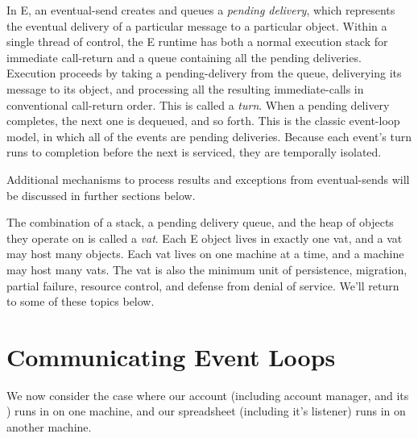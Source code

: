 \documentclass{llncs}
\begin{document}
In E, an eventual-send creates and queues a \emph{pending delivery},
which represents the eventual delivery of a particular message to a
particular object.  Within a single thread of control, the E runtime
has both a normal execution stack for immediate call-return and a
queue containing all the pending deliveries.  Execution proceeds by
taking a pending-delivery from the queue, deliverying its message to
its object, and processing all the resulting immediate-calls in
conventional call-return order.  This is called a \emph{turn}.  When a
pending delivery completes, the next one is dequeued, and so forth.
This is the classic event-loop model, in which all of the events are
pending deliveries. Because each event's turn runs to completion
before the next is serviced, they are temporally isolated.


Additional mechanisms to process results and exceptions from
eventual-sends will be discussed in further sections below.

The combination of a stack, a pending delivery queue, and the heap of
objects they operate on is called a \emph{vat}.  Each E object lives
in exactly one vat, and a vat may host many objects.  Each vat lives
on one machine at a time, and a machine may host many vats. The vat is
also the minimum unit of persistence, migration, partial failure,
resource control, and defense from denial of service. We'll return to
some of these topics below.


\section{Communicating Event Loops}

We now consider the case where our account (including account manager,
and its ) runs in  on one machine, and our
spreadsheet (including it's listener) runs in  on another
machine.
\end{document}
